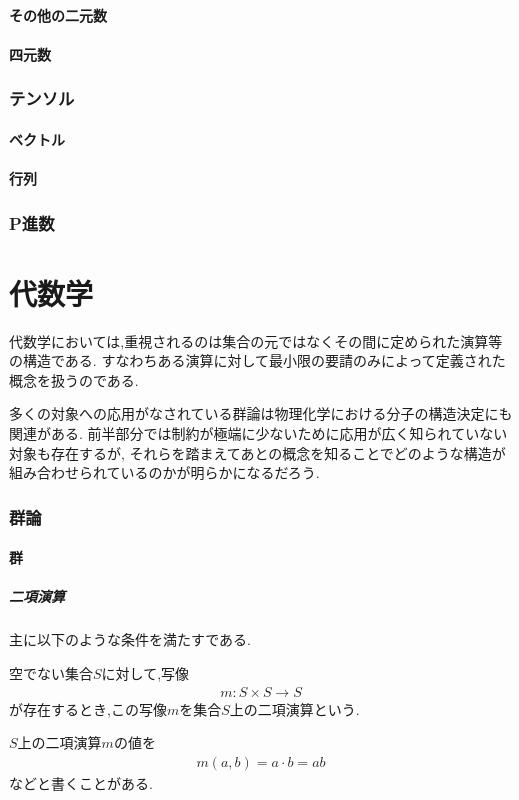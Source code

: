 \documentclass[hyperref,a4paper,12pt]{kininaruki}
\begin{document}
\subsection{その他の二元数}
\newpage
\subsection{四元数}
\newpage
\section{テンソル}
\subsection{ベクトル}
\newpage
\subsection{行列}
\newpage
\section{P進数}
\newpage
\part{代数学}
代数学においては,重視されるのは集合の元ではなくその間に定められた演算等の構造である.
すなわちある演算に対して最小限の要請のみによって定義された概念を扱うのである.

多くの対象への応用がなされている群論は物理化学における分子の構造決定にも関連がある.
前半部分では制約が極端に少ないために応用が広く知られていない対象も存在するが,
それらを踏まえてあとの概念を知ることでどのような構造が組み合わせられているのかが明らかになるだろう.
\section{群論}
\subsection{群}
\subsubsection{二項演算}
主に以下のような条件を満たすである.
\begin{shadebox}
	空でない集合$S$に対して,写像
	\begin{align}
		m:S\times{}S\longrightarrow{}S
	\end{align}
	が存在するとき,この写像$m$を集合$S$上の二項演算という.
	\begin{boxnote}
		$S$上の二項演算$m$の値を
		\begin{align}
			m(a, b) = a\cdot{}b = ab
		\end{align}
		などと書くことがある.
	\end{boxnote}
\end{shadebox}
\end{document}
